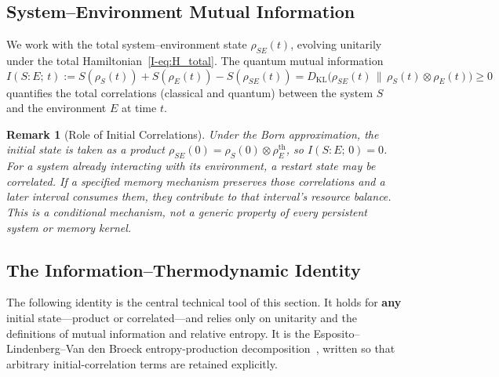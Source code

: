 \documentclass[12pt,a4paper,openany]{book}
\newtheorem{remark}[theorem]{Remark}
\begin{document}
\subsection{System--Environment Mutual Information}

We work with the total system--environment state
$\rho_{SE}(t)$, evolving unitarily under the total
Hamiltonian~\eqref{I-eq:H_total}.
The quantum mutual information
\begin{equation}
\label{I-eq:mutual_info}
I(S{:}E;\, t) := S(\rho_S(t)) + S(\rho_E(t))
  - S(\rho_{SE}(t))
= D_{\mathrm{KL}}\!\bigl(\rho_{SE}(t) \,\big\|\,
  \rho_S(t) \otimes \rho_E(t)\bigr)
\geq 0
\end{equation}
quantifies the total correlations (classical and quantum)
between the system $S$ and the environment $E$ at time $t$.

\begin{remark}[Role of Initial Correlations]
\label{I-rem:initial_corr}
Under the Born approximation, the initial state is taken as a
product $\rho_{SE}(0) = \rho_S(0) \otimes \rho_E^{\mathrm{th}}$,
so $I(S{:}E;\, 0) = 0$.
For a system already interacting with its environment, a restart state
\emph{may} be correlated.  If a specified memory mechanism preserves
those correlations and a later interval consumes them, they contribute
to that interval's resource balance.  This is a conditional mechanism,
not a generic property of every persistent system or memory kernel.
\end{remark}

\subsection{The Information--Thermodynamic Identity}

The following identity is the central technical tool of this
section.
It holds for \textbf{any} initial state---product or
correlated---and relies only on unitarity and the definitions
of mutual information and relative entropy.
It is the Esposito--Lindenberg--Van den Broeck entropy-production
decomposition~\cite{EspositoLindenbergVandenBroeck2010}, written so
that arbitrary initial-correlation terms are retained explicitly.
\end{document}
